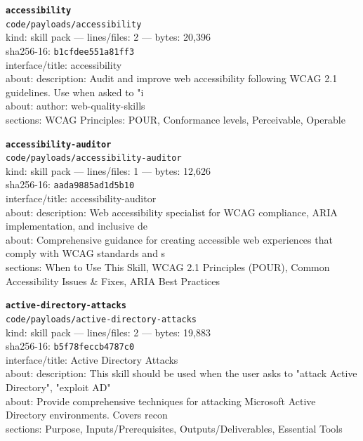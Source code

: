 \noindent\textbf{\texttt{accessibility}}\\
\texttt{code/payloads/accessibility}\\
kind: skill pack --- lines/files: 2 --- bytes: 20,396\\
sha256-16: \texttt{b1cfdee551a81ff3}\\
interface/title: accessibility\\
about: description: Audit and improve web accessibility following WCAG 2.1 guidelines. Use when asked to "i\\
about: author: web-quality-skills\\
sections: WCAG Principles: POUR, Conformance levels, Perceivable, Operable\\
\vspace*{6.0pt}

\noindent\textbf{\texttt{accessibility-auditor}}\\
\texttt{code/payloads/accessibility-auditor}\\
kind: skill pack --- lines/files: 1 --- bytes: 12,626\\
sha256-16: \texttt{aada9885ad1d5b10}\\
interface/title: accessibility-auditor\\
about: description: Web accessibility specialist for WCAG compliance, ARIA implementation, and inclusive de\\
about: Comprehensive guidance for creating accessible web experiences that comply with WCAG standards and s\\
sections: When to Use This Skill, WCAG 2.1 Principles (POUR), Common Accessibility Issues \& Fixes, ARIA Best Practices\\
\vspace*{6.0pt}

\noindent\textbf{\texttt{active-directory-attacks}}\\
\texttt{code/payloads/active-directory-attacks}\\
kind: skill pack --- lines/files: 2 --- bytes: 19,883\\
sha256-16: \texttt{b5f78feccb4787c0}\\
interface/title: Active Directory Attacks\\
about: description: This skill should be used when the user asks to "attack Active Directory", "exploit AD"\\
about: Provide comprehensive techniques for attacking Microsoft Active Directory environments. Covers recon\\
sections: Purpose, Inputs/Prerequisites, Outputs/Deliverables, Essential Tools\\
\vspace*{6.0pt}
\newpage

